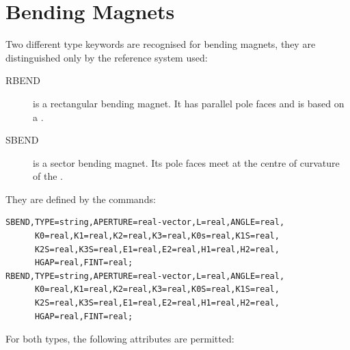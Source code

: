 \section{Bending Magnets}
\label{sec:bend}
Two different type keywords are recognised for bending magnets,
they are distinguished only by the reference system used:
\begin{description}
\item[RBEND] 
  \label{sec:rbend}
  is a rectangular bending magnet.
  It has parallel pole faces and is based on a
  .
\item[SBEND] 
  \label{sec:sbend}
  is a sector bending magnet.
  Its pole faces meet at the centre of curvature of the 
  .
\end{description}
They are defined by the commands:
\begin{verbatim}
SBEND,TYPE=string,APERTURE=real-vector,L=real,ANGLE=real,
      K0=real,K1=real,K2=real,K3=real,K0s=real,K1S=real,
      K2S=real,K3S=real,E1=real,E2=real,H1=real,H2=real,
      HGAP=real,FINT=real;
RBEND,TYPE=string,APERTURE=real-vector,L=real,ANGLE=real,
      K0=real,K1=real,K2=real,K3=real,K0S=real,K1S=real,
      K2S=real,K3S=real,E1=real,E2=real,H1=real,H2=real,
      HGAP=real,FINT=real;
\end{verbatim}
For both types, the following attributes are permitted:

